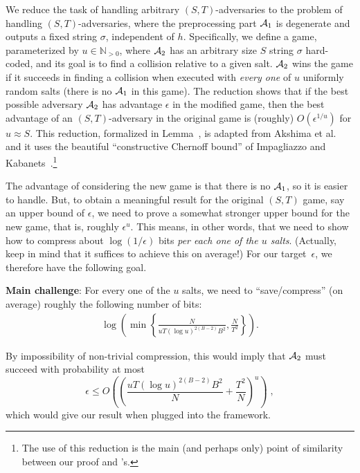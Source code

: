  We reduce the task of handling arbitrary $(S, T)$-adversaries to the problem of handling $(S, T)$-adversaries, where the preprocessing part $\mathcal{A}_1$ is degenerate and outputs a fixed string $\sigma$, independent of $h$. Specifically, we define a game, parameterized by $u\in \mathbb{N}_{>0}$, where $\mathcal{A}_2$ has an arbitrary size $S$ string $\sigma$ hard-coded, and its goal is to find a collision relative to a given salt. $\mathcal{A}_2$ wins the game if it succeeds in finding a collision when executed with \emph{every one} of $u$ uniformly random salts (there is no $\mathcal{A}_1$ in this game). The reduction shows that if the best possible adversary $\mathcal{A}_2$ has advantage $\epsilon$ in the modified game, then the best advantage of an $(S, T)$-adversary in the original game is (roughly) $O(\epsilon^{1/u})$ for $u\approx S$. 
This reduction, formalized in Lemma~, is adapted from Akshima et al.~\cite{AkshimaCDW20} and it uses the beautiful ``constructive Chernoff bound'' of Impagliazzo and Kabanets~\cite{AR:ImpKab10}.\footnote{The use of this reduction is the main (and perhaps only) point of similarity between our proof and \cite{AkshimaCDW20}'s.} 

The advantage of considering the new game is that there is no $\mathcal{A}_1$, so it is easier to handle. But, to obtain a meaningful result for the original $(S, T)$ game, say an upper bound of $\epsilon$, we need to prove a somewhat stronger upper bound for the new game, that is, roughly $\epsilon^{u}$.  This means, in other words, that we need to show how to compress about $\log (1/\epsilon)$ bits \emph{per each one of the $u$ salts}. 
(Actually, keep in mind that it suffices to achieve this on average!) 
For our target~$\epsilon$, we therefore have the following goal.

\begin{center} 
\textbf{Main challenge}: 
For every one of the $u$ salts, we need to ``save/compress'' (on average) roughly the following number of bits:
\begin{align*}
\log\left(\min\left\{\frac{N}{uT(\log u)^{2(B-2)}B^2},\frac{N}{T^2}\right\}\right).
\end{align*}
\end{center}
By impossibility of non-trivial compression, this would imply that $\mathcal{A}_2$ must succeed with probability at most 
$$\epsilon\le O\left(\left(\frac{uT(\log u)^{2(B-2)}B^2}{N}+\frac{T^2}{N}\right)^u\right)\;,$$
which would give our result when plugged into the framework. 

